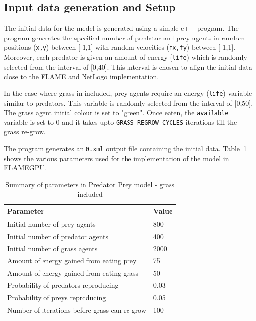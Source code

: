 \clearpage
\subsection{Input data generation and Setup}
The initial data for the model is generated using a simple c++ program. The program generates the specified number of predator and prey agents in random positions (\verb|x,y|) between [-1,1] with random velocities (\verb|fx,fy|) between [-1,1]. Moreover, each predator is given an amount of energy (\verb|life|) which is randomly selected from the interval of [0,40]. This interval is chosen to align the initial data close to the FLAME and NetLogo implementation. 

In the case where grass in included, prey agents require an energy (\verb|life|) variable similar to predators. This variable is randomly selected from the interval of [0,50]. The grass agent initial colour is set to "green". Once eaten, the \verb|available| variable is set to 0 and it takes upto \verb|GRASS_REGROW_CYCLES| iterations till the grass re-grow. 

The program generates an \verb|0.xml| output file containing the initial data. Table~\ref{tab:param} shows the various parameters used for the implementation of the model in FLAMEGPU.

\begin{table}[h]
\centering
\caption{Summary of parameters in Predator Prey model - grass included}
\begin{tabular}{ |l|l| } 
\hline
Parameter & Value \\
\hline\hline
Initial number of prey agents & 800\\\hline
Initial number of predator agents & 400\\\hline
Initial number of grass agents & 2000\\\hline
Amount of energy gained from eating prey & 75\\\hline
Amount of energy gained from eating grass & 50\\\hline
Probability of predators reproducing & 0.03\\\hline
Probability of preys reproducing & 0.05\\\hline
Number of iterations before grass can re-grow & 100\\
\hline
\end{tabular}
\label{tab:param}
\end{table}

